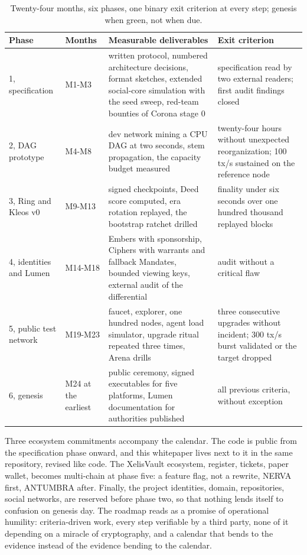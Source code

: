 \begin{table}[htbp]
\centering
\small
\caption{Twenty-four months, six phases, one binary exit criterion at
every step; genesis when green, not when due.}
\label{tab:roadmap}
\begin{tabularx}{\textwidth}{@{}L{2.5cm}L{1.4cm}YY@{}}
\toprule
Phase & Months & Measurable deliverables & Exit criterion \\
, specification & M1-M3 & written protocol, numbered architecture decisions, format sketches, extended social-core simulation with the seed sweep, red-team bounties of Corona stage 0 & specification read by two external readers; first audit findings closed \\
2, DAG prototype & M4-M8 & dev network mining a CPU DAG at two seconds, stem propagation, the capacity budget measured & twenty-four hours without unexpected reorganization; 100 tx/s sustained on the reference node \\
3, Ring and Kleos v0 & M9-M13 & signed checkpoints, Deed score computed, era rotation replayed, the bootstrap ratchet drilled & finality under six seconds over one hundred thousand replayed blocks \\
4, identities and Lumen & M14-M18 & Embers with sponsorship, Ciphers with warrants and fallback Mandates, bounded viewing keys, external audit of the differential & audit without a critical flaw \\
5, public test network & M19-M23 & faucet, explorer, one hundred nodes, agent load simulator, upgrade ritual repeated three times, Arena drills & three consecutive upgrades without incident; 300 tx/s burst validated or the target dropped \\
6, genesis & M24 at the earliest & public ceremony, signed executables for five platforms, Lumen documentation for authorities published & all previous criteria, without exception \\
\bottomrule
\end{tabularx}
\end{table}

Three ecosystem commitments accompany the calendar. The code is public
from the specification phase onward, and this whitepaper lives next to
it in the same repository, revised like code. The XelisVault ecosystem,
register, tickets, paper wallet, becomes multi-chain at phase five: a
feature flag, not a rewrite, NERVA first, ANTUMBRA after. Finally, the
project identities, domain, repositories, social networks, are reserved
before phase two, so that nothing lends itself to confusion on genesis
day. The roadmap reads as a promise of operational humility:
criteria-driven work, every step verifiable by a third party, none of it
depending on a miracle of cryptography, and a calendar that bends to the
evidence instead of the evidence bending to the calendar.

